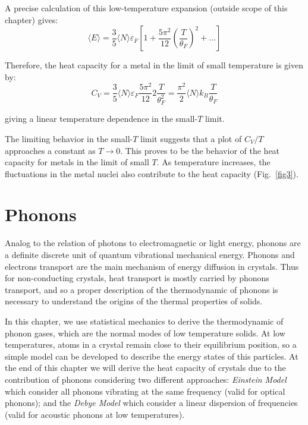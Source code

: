 \documentclass[book.tex]{subfiles}
\begin{document}
A precise calculation of this low-temperature expansion (outside
scope of this chapter) gives:
\begin{equation}\label{Eq15}
\langle E \rangle = \frac{3}{5}\langle N \rangle \varepsilon_F \left[1 +\frac{5\pi^2}{12}\left(\frac{T}{\theta_F}\right)^2 +...\right]
\end{equation}



Therefore, the heat capacity for a metal in the limit of small temperature is given by:
\begin{equation}\label{Eq16}
C_V = \frac{3}{5}\langle N \rangle \varepsilon_F \frac{5\pi^2}{12}2\frac{T}{\theta_F^2} = \frac{\pi^2}{2}\langle N \rangle k_B\frac{T}{\theta_F}
\end{equation}

\noindent giving a linear temperature dependence in the small-$T$ limit.

The limiting behavior in the small-$T$ limit suggests that a plot of $C_V/T$ approaches a constant as $T\rightarrow 0$. This proves to be the behavior of the heat capacity for metals in the limit of small $T$. As temperature increases, the fluctuations in the metal nuclei also contribute to the heat capacity (Fig.~\ref{fig3}).

\section{Phonons}
Analog to the relation of photons to electromagnetic or light energy, phonons are a definite discrete unit of quantum vibrational mechanical energy. Phonons and electrons transport are the main mechanism of energy diffusion in crystals. Thus for non-conducting crystals, heat transport is mostly carried by phonons transport, and so a proper description of the thermodynamic of phonons is necessary to understand the origins of the thermal properties of solids.

In this chapter, we use statistical mechanics to derive the thermodynamic of phonon gases, which are the normal modes of low temperature solids. At low temperatures, atoms in a crystal remain close to their equilibrium position, so a simple model can be developed to describe the energy states of this particles. At the end of this chapter we will derive the heat capacity of crystals due to the contribution of phonons considering two different approaches: \textit{Einstein Model} which consider all phonons vibrating at the same frequency (valid for optical phonons); and the \textit{Debye Model} which consider a linear dispersion of frequencies (valid for acoustic phonons at low temperatures). 
\newpage
\end{document}
